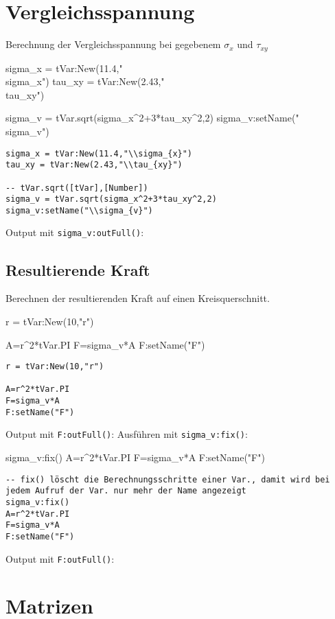 \section{Vergleichsspannung}
Berechnung der Vergleichsspannung bei gegebenem $\sigma_{x}$ und $\tau_{xy}$
\begin{luacode*}
	sigma_x = tVar:New(11.4,"\\sigma_{x}")
	tau_xy = tVar:New(2.43,"\\tau_{xy}")

	sigma_v = tVar.sqrt(sigma_x^2+3*tau_xy^2,2)
	sigma_v:setName("\\sigma_{v}")
\end{luacode*}
\begin{lstlisting}
sigma_x = tVar:New(11.4,"\\sigma_{x}")
tau_xy = tVar:New(2.43,"\\tau_{xy}")

-- tVar.sqrt([tVar],[Number])
sigma_v = tVar.sqrt(sigma_x^2+3*tau_xy^2,2)
sigma_v:setName("\\sigma_{v}")
\end{lstlisting}
Output mit \lstinline{sigma_v:outFull()}:
\subsection{Resultierende Kraft}
Berechnen der resultierenden Kraft auf einen Kreisquerschnitt.
\begin{luacode*}
	r = tVar:New(10,"r")

	A=r^2*tVar.PI
	F=sigma_v*A
	F:setName("F")
\end{luacode*}
\begin{lstlisting}
r = tVar:New(10,"r")

A=r^2*tVar.PI
F=sigma_v*A
F:setName("F")
\end{lstlisting}
Output mit \lstinline{F:outFull()}:
Ausführen mit \lstinline{sigma_v:fix()}:
\begin{luacode*}
	sigma_v:fix()
	A=r^2*tVar.PI
	F=sigma_v*A
	F:setName("F")
\end{luacode*}
\begin{lstlisting}
-- fix() löscht die Berechnungsschritte einer Var., damit wird bei jedem Aufruf der Var. nur mehr der Name angezeigt
sigma_v:fix()
A=r^2*tVar.PI
F=sigma_v*A
F:setName("F")
\end{lstlisting}
Output mit \lstinline{F:outFull()}:
\section{Matrizen}
